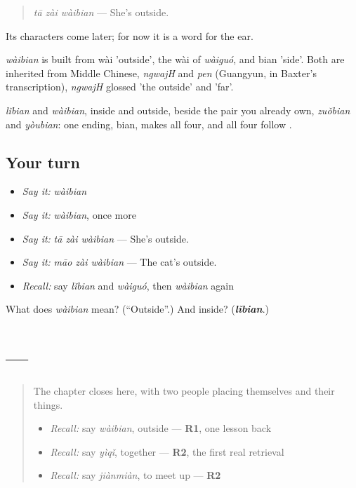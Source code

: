 \begin{quote}
\emph{tā zài wàibian} — She's outside.
\end{quote}

Its characters come later; for now it is a word for the ear.

\begin{cousinweb}
\emph{wàibian} is built from wài 'outside', the wài of \emph{wàiguó}, and bian 'side'. Both are inherited from Middle Chinese, \emph{ngwajH} and \emph{pen} (Guangyun, in Baxter's transcription), \emph{ngwajH} glossed 'the outside' and 'far'.
\end{cousinweb}

\begin{grammarlens}[title={What you've built}]
\emph{lǐbian} and \emph{wàibian}, inside and outside, beside the pair you already own, \emph{zuǒbian} and \emph{yòubian}: one ending, bian, makes all four, and all four follow .
\end{grammarlens}

\subsection*{Your turn}
\begin{itemize}
\raggedright
  \item \emph{Say it:} \emph{wàibian}
  \item \emph{Say it:} \emph{wàibian}, once more
  \item \emph{Say it:} \emph{tā zài wàibian} — She's outside.
  \item \emph{Say it:} \emph{māo zài wàibian} — The cat's outside.
  \item \emph{Recall:} say \emph{lǐbian} and \emph{wàiguó}, then \emph{wàibian} again
\end{itemize}

\begin{tcolorbox}[breakable,colback=teal!4,colframe=teal!35!black,title={Before you move on}]
What does \emph{wàibian} mean? (\textquotedblleft{}Outside\textquotedblright{}.) And inside? (\emph{\textbf{lǐbian}}.)
\end{tcolorbox}
\section[Practice]{ — }

\label{lesson:ZH-C85-practice}



\begin{quote}
The chapter closes here, with two people placing themselves and their things.

\begin{itemize}
\raggedright
  \item \emph{Recall:} say \emph{wàibian}, outside — \textbf{R1}, one lesson back
  \item \emph{Recall:} say \emph{yìqǐ}, together — \textbf{R2}, the first real retrieval
  \item \emph{Recall:} say \emph{jiànmiàn}, to meet up — \textbf{R2}
\end{itemize}
\end{quote}

